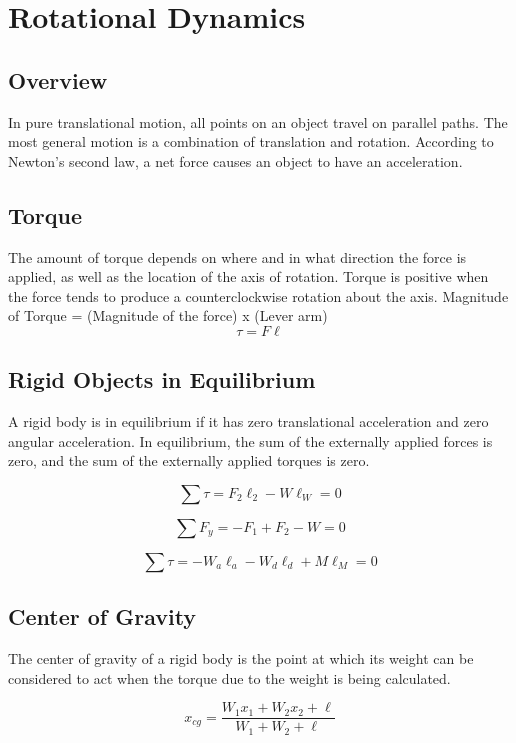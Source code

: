 \section{Rotational Dynamics}

\subsection{Overview}
In pure translational motion, all points on an object travel on parallel paths. The most general motion is a combination of  translation and rotation. According to Newton’s second law, a net force causes an object to have an acceleration.

\subsection{Torque}
The amount of torque depends on where and in what direction the force is applied, as well as the location of the axis of rotation. Torque is positive when the force tends to produce a counterclockwise rotation about the axis. \newline \newline
\centering
Magnitude of Torque = (Magnitude of the force) x (Lever arm)	
\[\tau=F\ell\]
\raggedright 

\subsection{Rigid Objects in Equilibrium}
A rigid body is in equilibrium if it has zero translational  acceleration and zero angular acceleration. In equilibrium,  the sum of the externally applied forces is zero, and the  sum of the externally applied torques is zero.

\[\sum\tau=F_2\ell _2-W\ell _W = 0\]

\[\sum F_y=-F_1+F_2-W=0\]

\[\sum\tau=-W_a\ell _a-W_d\ell _d+M\ell _M= 0\]

\subsection{Center of Gravity}
The center of gravity of a rigid body is the point at which its weight can be considered to act when the torque due to the weight is being calculated. 

\[x_{cg}=\frac{W_1x_1+W_2x_2+\ell}{W_1+W_2+\ell}\]


